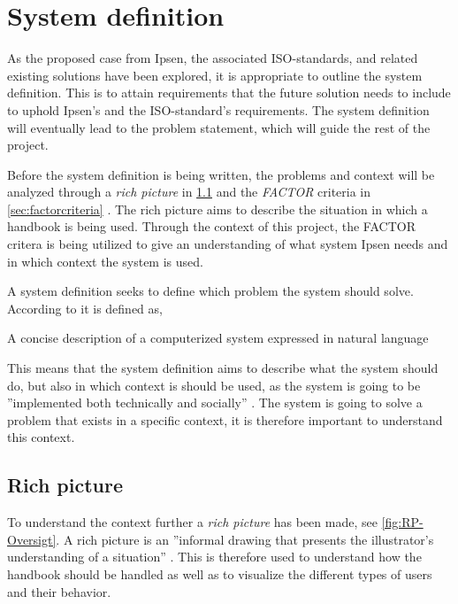\section{System definition}\label{sec:SystemDefinition}
As the proposed case from Ipsen, the associated ISO-standards, and related existing solutions have been explored, it is appropriate to outline the system definition.
This is to attain requirements that the future solution needs to include to uphold Ipsen's and the ISO-standard's requirements.
The system definition will eventually lead to the problem statement, which will guide the rest of the project.

Before the system definition is being written, the problems and context will be analyzed through a \textit{rich picture} in \cref{sec:richpictures} and the \textit{FACTOR} criteria in \cref{sec:factorcriteria} \citep{Rod-Aalborg}.
The rich picture aims to describe the situation in which a handbook is being used.
Through the context of this project, the FACTOR critera is being utilized to give an understanding of what system Ipsen needs and in which context the system is used.

A system definition seeks to define which problem the system should solve.
According to  \citep[p.~24]{Rod-Aalborg} it is defined as,

\begin{defn}
A concise description of a computerized system expressed in natural language
\end{defn}

This means that the system definition aims to describe what the system should do, but also in which context is should be used, as the system is going to be ''implemented both technically and socially'' \citep[p.~23]{Rod-Aalborg}.
The system is going to solve a problem that exists in a specific context, it is therefore important to understand this context.

\subsection{Rich picture} \label{sec:richpictures}

To understand the context further a \textit{rich picture} has been made, see \cref{fig:RP-Oversigt}. A rich picture is an ''informal drawing that presents the illustrator's understanding of a situation'' \citep[~p. 26]{Rod-Aalborg}.
This is therefore used to understand how the handbook should be handled as well as to visualize the different types of users and their behavior.

